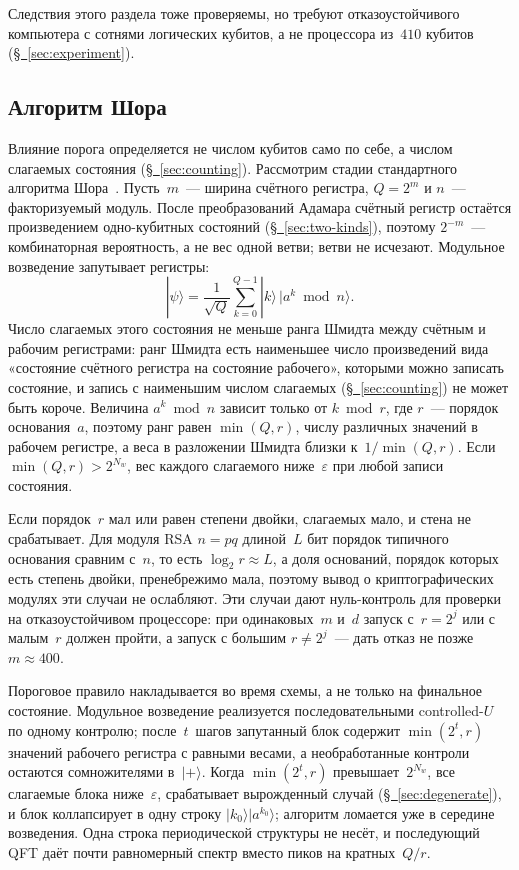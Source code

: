 \documentclass[11pt,a4paper]{article}
\newcommand{\CollapseRule}{Пороговое правило}
\begin{document}
Следствия этого раздела тоже проверяемы, но требуют отказоустойчивого компьютера с сотнями логических кубитов, а не процессора из~$410$ кубитов (\hyperref[sec:experiment]{\S~\ref*{sec:experiment}}).

\subsection{Алгоритм Шора}
\label{sec:shor}

Влияние порога определяется не числом кубитов само по себе, а числом слагаемых состояния (\hyperref[sec:counting]{\S~\ref*{sec:counting}}). Рассмотрим стадии стандартного алгоритма Шора~\cite{shor1997}. Пусть~$m$~--- ширина счётного регистра, $Q=2^m$ и $n$~--- факторизуемый модуль. После преобразований Адамара счётный регистр остаётся произведением одно-кубитных состояний (\hyperref[sec:two-kinds]{\S~\ref*{sec:two-kinds}}), поэтому $2^{-m}$~--- комбинаторная вероятность, а не вес одной ветви; ветви не исчезают. Модульное возведение запутывает регистры:
\begin{equation}
|\psi\rangle=\frac1{\sqrt Q}\sum_{k=0}^{Q-1}|k\rangle\,|a^k\bmod n\rangle.
\end{equation}
Число слагаемых этого состояния не меньше ранга Шмидта между счётным и рабочим регистрами: ранг Шмидта есть наименьшее число произведений вида «состояние счётного регистра на состояние рабочего», которыми можно записать состояние, и запись с наименьшим числом слагаемых (\hyperref[sec:counting]{\S~\ref*{sec:counting}}) не может быть короче. Величина $a^k\bmod n$ зависит только от $k\bmod r$, где $r$~--- порядок основания~$a$, поэтому ранг равен $\min(Q,r)$, числу различных значений в рабочем регистре, а веса в разложении Шмидта близки к~$1/\min(Q,r)$. Если $\min(Q,r)>2^{N_w}$, вес каждого слагаемого ниже~$\varepsilon$ при любой записи состояния.

Если порядок~$r$ мал или равен степени двойки, слагаемых мало, и стена не срабатывает. Для модуля RSA $n=pq$ длиной~$L$ бит порядок типичного основания сравним с~$n$, то есть $\log_2 r\approx L$, а доля оснований, порядок которых есть степень двойки, пренебрежимо мала, поэтому вывод о криптографических модулях эти случаи не ослабляют. Эти случаи дают нуль-контроль для проверки на отказоустойчивом процессоре: при одинаковых~$m$ и~$d$ запуск с~$r=2^j$ или с малым~$r$ должен пройти, а запуск с большим $r\ne2^j$~--- дать отказ не позже $m\approx400$.

\CollapseRule{} накладывается во время схемы, а не только на финальное состояние. Модульное возведение реализуется последовательными controlled-$U$ по одному контролю; после~$t$~шагов запутанный блок содержит $\min(2^t,r)$ значений рабочего регистра с равными весами, а необработанные контроли остаются сомножителями в~$|+\rangle$. Когда $\min(2^t,r)$ превышает~$2^{N_w}$, все слагаемые блока ниже~$\varepsilon$, срабатывает вырожденный случай (\hyperref[sec:degenerate]{\S~\ref*{sec:degenerate}}), и блок коллапсирует в одну строку $|k_0\rangle|a^{k_0}\rangle$; алгоритм ломается уже в середине возведения. Одна строка периодической структуры не несёт, и последующий QFT даёт почти равномерный спектр вместо пиков на кратных~$Q/r$.
\end{document}
